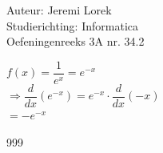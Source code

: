 \documentclass[a4paper]{article}
\begin{document}
  
\noindent \large Auteur: Jeremi Lorek\\
\noindent \large Studierichting: Informatica\\
\noindent \large Oefeningenreeks 3A nr. 34.2\\

\medskip
\normalsize

$f(x) = \dfrac{1}{e^x} = e^{-x}$  \\

$\Rightarrow \dfrac{d}{dx} \left( e^{-x} \right) = e^{-x} \cdot \dfrac{d}{dx} (-x)$  \\

$=- e^{-x}$  \\


\begin{thebibliography}{999}
\end{thebibliography}
\end{document}
